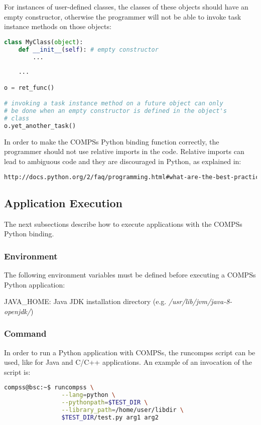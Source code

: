                          
For instances of user-defined classes, the classes of these objects 
should have an empty constructor, otherwise the programmer will not be able to invoke task instance 
methods on those objects:
                                   
\begin{lstlisting}[language=python]
class MyClass(object):
    def __init__(self): # empty constructor
        ...
        
    ...

o = ret_func()

# invoking a task instance method on a future object can only
# be done when an empty constructor is defined in the object's
# class
o.yet_another_task()
\end{lstlisting}

In order to make the COMPSs Python binding function correctly, the programmer should not use relative imports in the code.
Relative imports can lead to ambiguous code and they are discouraged in Python, as explained in:

\begin{lstlisting}[language=html]
http://docs.python.org/2/faq/programming.html#what-are-the-best-practices-for-using-import-in-a-module
\end{lstlisting}


\subsection{Application Execution}
The next subsections describe how to execute applications with the COMPSs Python binding.

\subsubsection{Environment}
The following environment variables must be defined before executing a COMPSs Python application:

JAVA\_HOME: Java JDK installation directory (e.g. \textit{/usr/lib/jvm/java-8-openjdk/})

\subsubsection{Command}
In order to run a Python application with COMPSs, the runcompss script can be used, like for 
Java and C/C++ applications. An example of an invocation of the script is:

\begin{lstlisting}[language=bash]
compss@bsc:~$ runcompss \
                --lang=python \
                --pythonpath=$TEST_DIR \
                --library_path=/home/user/libdir \
                $TEST_DIR/test.py arg1 arg2
\end{lstlisting}

